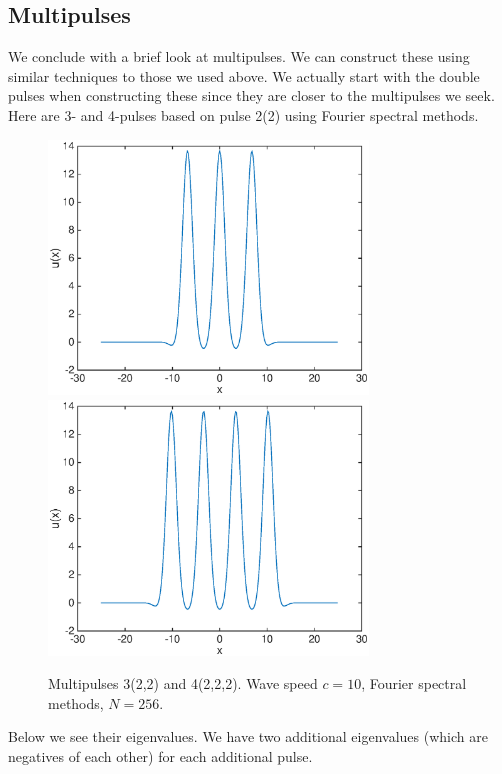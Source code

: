 \documentclass[12pt]{article}
\begin{document}
\subsection{Multipulses}

We conclude with a brief look at multipulses. We can construct these using similar techniques to those we used above. We actually start with the double pulses when constructing these since they are closer to the multipulses we seek. Here are 3- and 4-pulses based on pulse 2(2) using Fourier spectral methods.

\begin{figure}[H]
	\includegraphics[width=8.5cm]{four10um1_3}
	\includegraphics[width=8.5cm]{four10um1_4.eps}
	\caption{Multipulses 3(2,2) and 4(2,2,2). Wave speed $c = 10$, Fourier spectral methods, $N = 256$.}
\end{figure}

Below we see their eigenvalues. We have two additional eigenvalues (which are negatives of each other) for each additional pulse.
\end{document}
